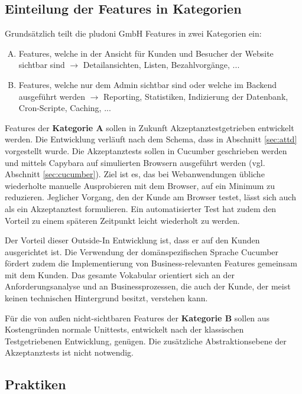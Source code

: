 \subsection{Einteilung der Features in Kategorien}
Grundsätzlich teilt die pludoni GmbH Features in zwei Kategorien ein:

\begin{enumerate}[A.]

 \item Features, welche in der Ansicht für Kunden und Besucher der Website sichtbar sind $\to$ Detailansichten, Listen, Bezahlvorgänge, ...
 \item Features, welche nur dem Admin sichtbar sind oder welche im Backend ausgeführt werden $\to$ Reporting, Statistiken, Indizierung der Datenbank, Cron-Scripte, Caching, ...
\end{enumerate}

Features der \textbf{Kategorie A} sollen in Zukunft Akzeptanztestgetrieben entwickelt werden. Die Entwicklung verläuft nach dem Schema, dass in Abschnitt \ref{sec:attd} vorgestellt wurde. Die Akzeptanztests sollen in Cucumber geschrieben werden und mittels Capybara auf simulierten Browsern ausgeführt werden (vgl. Abschnitt \ref{sec:cucumber}).
Ziel ist es, das bei Webanwendungen übliche wiederholte manuelle Ausprobieren mit dem Browser, auf ein Minimum zu reduzieren. Jeglicher Vorgang, den der Kunde am Browser testet, lässt sich auch als ein Akzeptanztest formulieren. Ein automatisierter Test hat zudem den Vorteil zu einem späteren Zeitpunkt leicht wiederholt zu werden.

Der Vorteil dieser Outside-In Entwicklung ist, dass er auf den Kunden ausgerichtet ist. Die Verwendung der domänspezifischen Sprache Cucumber fördert zudem die Implementierung von Business-relevanten Features gemeinsam mit dem Kunden. Das gesamte Vokabular orientiert sich an der Anforderungsanalyse und an Businessprozessen, die auch der Kunde, der meist keinen technischen Hintergrund besitzt, verstehen kann.

Für die von außen nicht-sichtbaren Features der \textbf{Kategorie B} sollen aus Kostengründen normale Unittests, entwickelt nach der klassischen Testgetriebenen Entwicklung, genügen. Die zusätzliche Abstraktionsebene der Akzeptanztests ist nicht notwendig.

\subsection{Praktiken}
\label{sec:auswahlWeitere}

